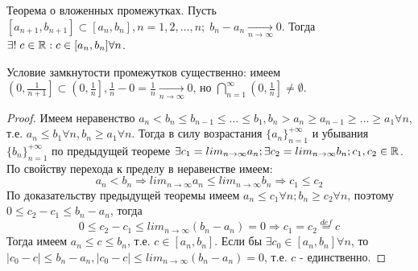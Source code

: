 \documentclass[main]{subfiles}
\begin{document}
\begin{theorem}
    Теорема о вложенных промежутках. Пусть $[a_{n+1}, b_{n+1}] \subset 
    [a_n, b_n], n = 1, 2, \ldots, n; \; b_n - a_n \underset{n\to\infty}{\to} 0$.
    Тогда $\exists! \; c \in \mathbb{R} : c \in [a_n, b_n] \forall n$. 
\end{theorem}
\begin{remark}
    Условие замкнутости промежутков существенно: имеем 
    $\left(0, \frac{1}{n + 1}\right] \subset \left(0, \frac{1}{n}\right], 
    \frac{1}{n} - 0  = \frac{1}{n} \underset{n\to\infty}{\to} 0$, но 
    $\bigcap_{n=1}^\infty\left(0, \frac{1}{n}\right] \neq \emptyset$.
\end{remark}
\begin{proof}
    Имеем неравенство $a_n < b_n \leq b_{n-1} \leq \ldots \leq b_1, 
    b_n > a_n \geq a_{n-1} \geq \ldots \geq a_1 \forall n$, т.е. 
    $a_n \leq b_1 \forall n, b_n \geq a_1 \forall n$. Тогда в силу 
    возрастания $\{a_n\}_{n=1}^{+\infty}$ и убывания $\{b_n\}_{n=1}^{+\infty}$
    по предыдущей теореме $\exists c_1 = lim_{n\to\infty}a_n; \exists c_2 = 
    lim_{n\to\infty}b_n; c_1, c_2 \in \mathbb{R}$. По свойству перехода к пределу 
    в неравенстве имеем: 
    \begin{equation*}
        a_n < b_n \Rightarrow lim_{n\to\infty}a_n \leq lim_{n\to\infty}b_n
        \Rightarrow c_1 \leq c_2
    \end{equation*}
    По доказательству предыдущей теоремы имеем $a_n \leq c_1 \forall n; 
    b_n \geq c_2 \forall n$, поэтому $0 \leq c_2 - c_1 \leq b_n - a_n$,
    тогда
    \begin{equation*}
        0 \leq c_2 - c_1 \leq lim_{n\to\infty}(b_n - a_n) = 0 \Rightarrow
        c_1 = c_2 \overset{def}{=} c
    \end{equation*}
    Тогда имеем $a_n \leq c \leq b_n$, т.е. $c \in [a_n, b_n]$.
    Если бы $\exists c_0 \in [a_n, b_n] \forall n$, то $|c_0 - c| \leq b_n - a_n,
    |c_0 - c| \leq lim_{n\to\infty}(b_n - a_n) = 0$, т.е. $c$ - единственно.
\end{proof}
\end{document}
